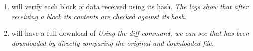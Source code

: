 \begin{enumerate}
  \item {} will verify each block of data received using its hash.
  \newline\textit{The logs show that after receiving a block its contents are checked against its hash.}

  \item {} will have a full download of 
  \newline\textit{Using the diff command, we can see that  has been downloaded by directly comparing the original and downloaded file.}
  
\end{enumerate}